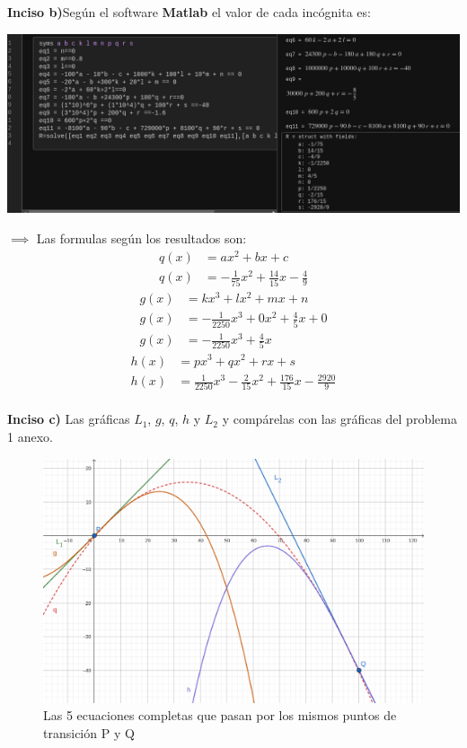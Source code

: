 \textbf{Inciso b)}Según el software \textbf{Matlab} el valor de cada incógnita es:
\begin{center}
	\includegraphics[height = 0.25\textheight]{recursos/Captura desde 2024-09-22 13-05-43.png}\par
\end{center}

$\implies$ Las formulas según los resultados son:
\begin{align}
	q(x) & =ax^2+bx+c                                   \\
	q(x) & =-\frac{1}{75}x^2+\frac{14}{15}x-\frac{4}{9}
\end{align}
\begin{align*}
	g(x) & =kx^3+lx^2+mx+n                         \\
	g(x) & =-\frac{1}{2250}x^3+0x^2+\frac{4}{5}x+0 \\
	g(x) & =-\frac{1}{2250}x^3+\frac{4}{5}x
\end{align*}
\begin{align*}
	h(x) & =px^3+qx^2+rx+s                                                   \\
	h(x) & =\frac{1}{2250}x^3-\frac{2}{15}x^2+\frac{176}{15}x-\frac{2920}{9} \\
\end{align*}

\textbf{Inciso c)} Las gráficas $L_1$, $g$, $q$, $h$ y $L_2$ y compárelas con las gráficas del problema 1 anexo.

\begin{figure}
	\centering
	\includegraphics[height = 0.25\textheight]{recursos/geogebra-export1.png}\par
	\caption*{Las 5 ecuaciones completas que pasan por los mismos puntos de transición P y Q}
\end{figure}

